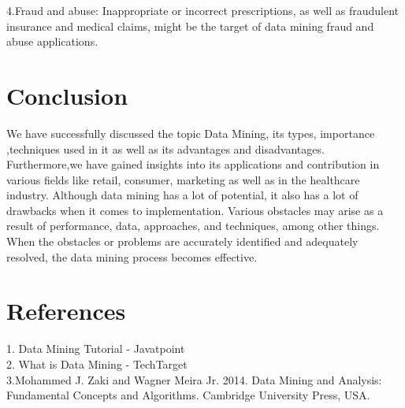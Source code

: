 \documentclass[12pt,letterpaper]{article}
\begin{document}
 4.Fraud and abuse:
Inappropriate or incorrect prescriptions, as well as fraudulent insurance and medical claims, might be the target of data mining fraud and abuse applications.\\
\section{Conclusion}
We have successfully discussed the topic Data Mining, its types, importance ,techniques used in it as well as its advantages and disadvantages. Furthermore,we have gained insights into its applications and contribution in various fields like retail, consumer, marketing  as well as in the healthcare industry. Although data mining has a lot of potential, it also has a lot of drawbacks when it comes to implementation. Various obstacles may arise as a result of performance, data, approaches, and techniques, among other things. When the obstacles or problems are accurately identified and adequately resolved, the data mining process becomes effective.

\section{References}
1. Data Mining Tutorial - Javatpoint \\
2. What is Data Mining - TechTarget \\
3.Mohammed J. Zaki and Wagner Meira Jr. 2014. Data Mining and Analysis: Fundamental Concepts and Algorithms. Cambridge University Press, USA.
\end{document}
